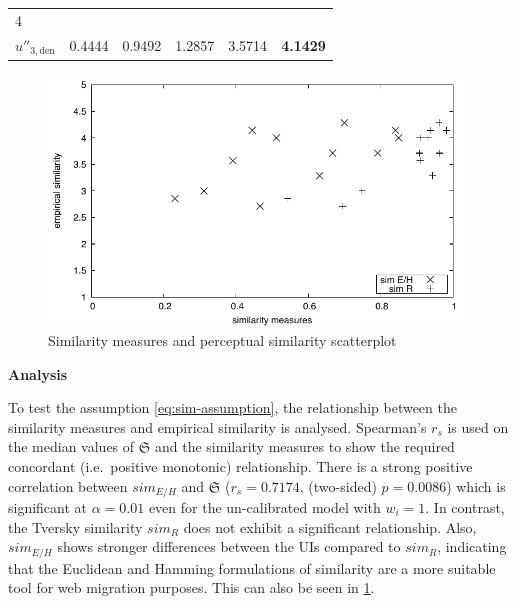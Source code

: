 \begin{longtable}[]{@{}llllll@{}}
\begin{minipage}[t]{0.17\columnwidth}
4\strut
\end{minipage}\tabularnewline
\begin{minipage}[t]{0.15\columnwidth}\raggedright
\(u''_{3,\text{den}}\)\strut
\end{minipage} & \begin{minipage}[t]{0.08\columnwidth}\raggedright
0.4444\strut
\end{minipage} & \begin{minipage}[t]{0.07\columnwidth}\raggedright
0.9492\strut
\end{minipage} & \begin{minipage}[t]{0.20\columnwidth}\raggedright
1.2857\strut
\end{minipage} & \begin{minipage}[t]{0.17\columnwidth}\raggedright
3.5714\strut
\end{minipage} & \begin{minipage}[t]{0.17\columnwidth}\raggedright
\textbf{4.1429}\strut
\end{minipage}\tabularnewline
\bottomrule
\end{longtable}

\begin{figure}
\hypertarget{fig:ci.scatter}{%
\centering
\includegraphics[width=0.99\textwidth]{../figures/visual-scatter.pdf}
\caption{Similarity measures and perceptual similarity scatterplot}\label{fig:ci.scatter}
}
\end{figure}

\textbf{Analysis}

To test the assumption \cref{eq:sim-assumption}, the relationship between the similarity measures and empirical similarity is analysed.
Spearman's \(r_s\) is used on the median values of \(\mathfrak{S}\) and the similarity measures to show the required concordant (i.e.~positive monotonic) relationship.
There is a strong positive correlation between \(sim_{E/H}\) and \(\mathfrak{S}\) (\(r_s=0.7174\), (two-sided) \(p=0.0086\)) which is significant at \(\alpha=0.01\) even for the un-calibrated model with \(w_i=1\).
In contrast, the Tversky similarity \(sim_R\) does not exhibit a significant relationship.
Also, \(sim_{E/H}\) shows stronger differences between the UIs compared to \(sim_R\), indicating that the Euclidean and Hamming formulations of similarity are a more suitable tool for web migration purposes.
This can also be seen in \cref{fig:ci.scatter}.

